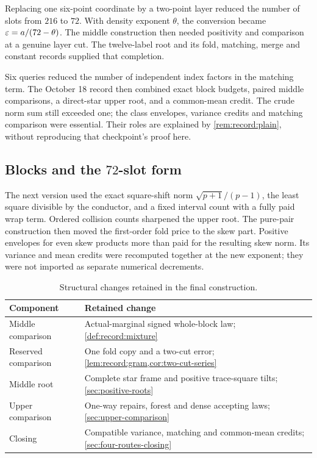 Replacing one six-point coordinate by a two-point layer reduced the
number of slots from $216$ to $72$. With density exponent $\theta$,
the conversion became $\varepsilon=a/(72-\theta)$. The middle construction
then needed positivity and comparison at a genuine layer cut.
The twelve-label root and its fold, matching, merge and constant
records supplied that completion.

Six queries reduced the number of independent index factors in the
matching term. The October 18 record then combined exact block budgets,
paired middle comparisons, a direct-star upper root, and a common-mean
credit. The crude norm sum still exceeded one; the class envelopes,
variance credits and matching comparison were essential. Their roles
are explained by \cref{rem:record:plain}, without reproducing that
checkpoint's proof here.

\subsection{Blocks and the \texorpdfstring{$72$}{72}-slot form}\label{subsec:history:oct24}

The next version used the exact square-shift norm
$\sqrt{p+1}/(p-1)$, the least square divisible by the conductor,
and a fixed interval count with a fully paid wrap term.
Ordered collision counts sharpened the upper root.
The pure-pair construction then moved the first-order fold price to
the skew part. Positive envelopes for even skew products more than
paid for the resulting skew norm. Its variance and mean credits were
recomputed together at the new exponent; they were not imported as
separate numerical decrements.

\begin{table}[htbp]
\centering\small
\caption{Structural changes retained in the final construction.}
\label{tab:history:components}
\begin{tabular}{@{}p{}p{}@{}}
\toprule
Component & Retained change\\ \midrule
Middle comparison & Actual-marginal signed whole-block law;
\cref{def:record:mixture}\\
Reserved comparison & One fold copy and a two-cut error;
\cref{lem:record:gram,cor:two-cut-series}\\
Middle root & Complete star frame and positive trace-square tilts;
\cref{sec:positive-roots}\\
Upper comparison & One-way repairs, forest and dense accepting laws;
\cref{sec:upper-comparison}\\
Closing & Compatible variance, matching and common-mean credits;
\cref{sec:four-routes-closing}\\
\bottomrule
\end{tabular}
\end{table}

